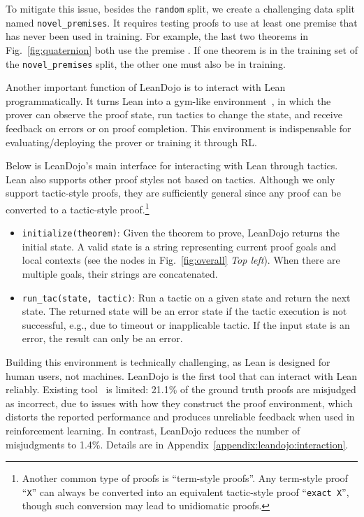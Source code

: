 To mitigate this issue, besides the \texttt{random} split, we create a challenging data split named \texttt{novel\_premises}. It requires testing proofs to use at least one premise that has never been used in training. For example, the last two theorems in Fig.~\ref{fig:quaternion} both use the premise . If one theorem is in the training set of the \texttt{novel\_premises} split, the other one must also be in training.


Another important function of LeanDojo is to interact with Lean programmatically. It turns Lean into a gym-like environment~\cite{brockman2016openai}, in which the prover can observe the proof state, run tactics to change the state, and receive feedback on errors or on proof completion. This environment is indispensable for evaluating/deploying the prover or training it through RL. 

Below is LeanDojo's main interface for interacting with Lean through tactics. Lean also supports other proof styles not based on tactics. Although we only support tactic-style proofs, they are sufficiently general since any proof can be converted to a tactic-style proof.\footnote{Another common type of proofs is ``term-style proofs''. Any term-style proof ``\texttt{X}'' can always be converted into an equivalent tactic-style proof ``\texttt{exact X}'', though such conversion may lead to unidiomatic proofs.}
\begin{itemize}

\item \texttt{initialize(theorem)}: Given the theorem to prove, LeanDojo returns the initial state. A valid state is a string representing current proof goals and local contexts (see the nodes in Fig.~\ref{fig:overall} \emph{Top left}). When there are multiple goals, their strings are concatenated.

\item \texttt{run\_tac(state, tactic)}: Run a tactic on a given state and return the next state. The returned state will be an error state if the tactic execution is not successful, e.g., due to timeout or inapplicable tactic. If the input state is an error, the result can only be an error.

\end{itemize}

Building this environment is technically challenging, as Lean is designed for human users, not machines. LeanDojo is the first tool that can interact with Lean reliably. Existing tool~\cite{polu2023formal} is limited: 21.1\% of the ground truth proofs are misjudged as incorrect, due to issues with how they construct the proof environment, which distorts the reported performance and produces unreliable feedback when used in reinforcement learning. In contrast, LeanDojo reduces the number of misjudgments to 1.4\%. Details are in Appendix~\ref{appendix:leandojo:interaction}.

